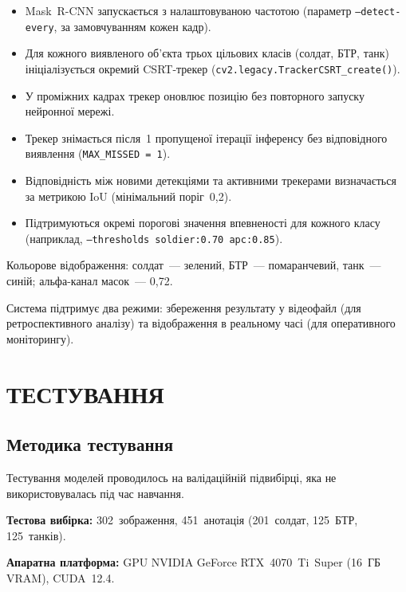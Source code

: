 \documentclass[14pt,a4paper]{extreport}
\begin{document}
\begin{itemize}
  \item Mask~R-CNN запускається з налаштовуваною частотою
        (параметр \texttt{--detect-every}, за замовчуванням кожен кадр).
  \item Для кожного виявленого об'єкта трьох цільових класів
        (солдат, БТР, танк) ініціалізується окремий CSRT-трекер
        (\texttt{cv2.legacy.\allowbreak TrackerCSRT\_create()}).
  \item У проміжних кадрах трекер оновлює позицію без повторного
        запуску нейронної мережі.
  \item Трекер знімається після~1 пропущеної ітерації інференсу без
        відповідного виявлення (\texttt{MAX\_MISSED~=~1}).
  \item Відповідність між новими детекціями та активними трекерами
        визначається за метрикою IoU (мінімальний поріг~0{,}2).
  \item Підтримуються окремі порогові значення впевненості для кожного
        класу (наприклад, \texttt{--thresholds soldier:0.70 apc:0.85}).
\end{itemize}

Кольорове відображення: солдат~--- зелений, БТР~--- помаранчевий,
танк~--- синій; альфа-канал масок~--- 0{,}72.

Система підтримує два режими: збереження результату у відеофайл
(для ретроспективного аналізу) та відображення в реальному часі
(для оперативного моніторингу).

\chapter{ТЕСТУВАННЯ}

\section{Методика тестування}

Тестування моделей проводилось на валідаційній підвибірці, яка не
використовувалась під час навчання.

\textbf{Тестова вибірка:} 302~зображення, 451~анотація (201~солдат,
125~БТР, 125~танків).

\textbf{Апаратна платформа:} GPU NVIDIA GeForce RTX~4070~Ti~Super
(16~ГБ VRAM), CUDA~12.4.
\end{document}
